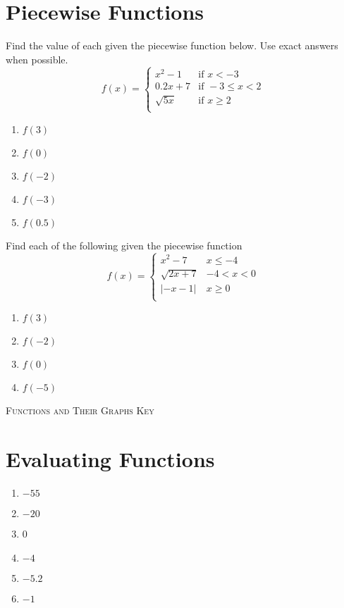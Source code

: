 \section{Piecewise Functions}

Find the value of each given the piecewise function below. Use exact answers when possible.
\[
f(x) = \begin{cases}
    x^2-1   &\text{if } x < -3 \\
    0.2x+7  &\text{if } -3 \leq x < 2   \\
    \sqrt{5x}   &\text{if } x \geq 2    \\
\end{cases}
\]
\begin{enumerate}
\item $f(3)$
\item $f(0)$
\item $f(-2)$
\item $f(-3)$
\item $f(0.5)$
\setcounter{Review}{\value{enumi}}
\end{enumerate}

Find each of the following given the piecewise function
\[f(x) = 
\begin{cases}
x^2-7 & x \leq -4 \\
\sqrt{2x+7} & -4 < x < 0 \\
|-x-1| & x \geq 0 \\
\end{cases}
\]
\begin{enumerate}	\setcounter{enumi}{\value{Review}}
\item $f(3)$
\item $f(-2)$
\item $f(0)$
\item $f(-5)$
\setcounter{Review}{\value{enumi}}
\end{enumerate}

\newpage

\textsc{Functions and Their Graphs Key}	

\section*{Evaluating Functions}

\begin{enumerate}
	\item $-55$
	\item $-20$
	\item 0
	\item $-4$
	\item $-5.2$
	\item $-1$
\end{enumerate}

